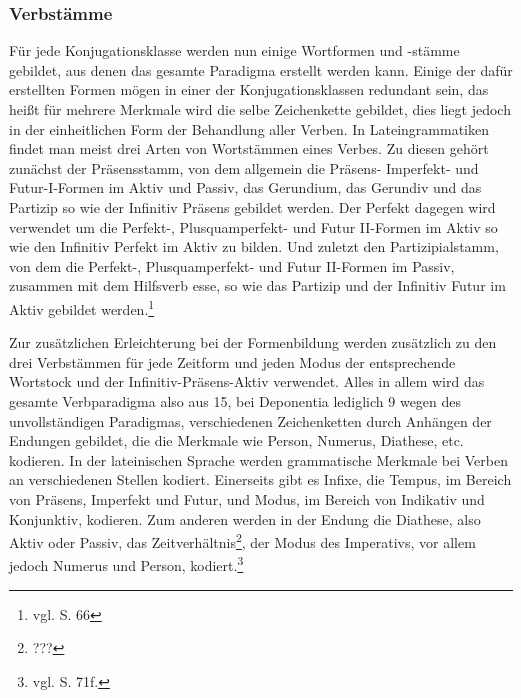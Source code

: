 \documentclass[fontsize=12pt,abstract=on,titlepage,bibliography=totoc,ngerman,listof=totoc]{scrreprt}
\begin{document}
\subsubsection{Verbstämme}
Für jede Konjugationsklasse werden nun einige Wortformen und -stämme gebildet, aus denen das gesamte Paradigma erstellt werden kann. Einige der dafür erstellten Formen mögen in einer der Konjugationsklassen redundant sein, das heißt für mehrere Merkmale wird die selbe Zeichenkette gebildet, dies liegt jedoch in der einheitlichen Form der Behandlung aller Verben. In Lateingrammatiken findet man meist drei Arten von Wortstämmen eines Verbes. Zu diesen gehört zunächst der Präsensstamm, von dem allgemein die Präsens- Imperfekt- und Futur-I-Formen im Aktiv und Passiv, das Gerundium, das Gerundiv und das Partizip so wie der Infinitiv Präsens gebildet werden. Der Perfekt dagegen wird verwendet um die Perfekt-, Plusquamperfekt- und Futur II-Formen im Aktiv so wie den Infinitiv Perfekt im Aktiv zu bilden. Und zuletzt den Partizipialstamm, von dem die Perfekt-, Plusquamperfekt- und Futur II-Formen im Passiv, zusammen mit dem Hilfsverb esse, so wie das Partizip und der Infinitiv Futur im Aktiv gebildet werden.\footnote{vgl. \cite{BAYER-LINDAUER1994} S. 66} \par
Zur zusätzlichen Erleichterung bei der Formenbildung werden zusätzlich zu den drei Verbstämmen für jede Zeitform und jeden Modus der entsprechende Wortstock und der Infinitiv-Präsens-Aktiv verwendet. Alles in allem wird das gesamte Verbparadigma also aus 15, bei Deponentia lediglich 9 wegen des unvollständigen Paradigmas, verschiedenen Zeichenketten durch Anhängen der Endungen gebildet, die die Merkmale wie Person, Numerus, Diathese, etc. kodieren. In der lateinischen Sprache werden grammatische Merkmale bei Verben an verschiedenen Stellen kodiert. Einerseits gibt es Infixe, die Tempus, im Bereich von Präsens, Imperfekt und Futur, und Modus, im Bereich von Indikativ und Konjunktiv, kodieren. Zum anderen werden in der Endung die Diathese, also Aktiv oder Passiv, das Zeitverhältnis\footnote{???}, der Modus des Imperativs, vor allem jedoch Numerus und Person, kodiert.\footnote{vgl. \cite{BAYER-LINDAUER1994} S. 71f.} \par
\end{document}
